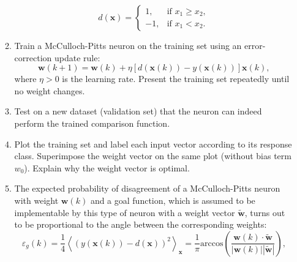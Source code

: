 \documentclass[12pt, a4]{article}
\begin{document}
\begin{enumerate}
\begin{enumerate}
                \begin{equation*}
                    d(\mathbf{x})=
                    \begin{cases}
                        1, & \text{if } x_1\geq x_2, \\
                        -1, & \text{if } x_1<x_2.
                    \end{cases}
                \end{equation*}
            \item Train a McCulloch-Pitts neuron on the training set
                using an error-correction update rule:
                \begin{equation}
                    \textbf{w}(k+1)=\mathbf{w}(k)+\eta
                    [d(\mathbf{x}(k))-y(\mathbf{x}(k))]\mathbf{x}(k),
                    \label{eq:errorupdate}
                \end{equation}
                where $\eta>0$ is the learning rate.
                Present the training set repeatedly until no weight
                changes.
            \item Test on a new dataset (validation set) that the
                neuron can indeed perform the trained comparison function.
            \item\label{it:optimalweight} Plot the training set and label each
                input vector according to its response class. Superimpose the
                weight vector on the same plot (without bias term $w_0$).
                Explain why the weight vector is optimal.
            \item \label{it:gen_error} The expected probability of disagreement
                of a McCulloch-Pitts neuron with weight $\mathbf{w}(k)$ and a
                goal function, which is assumed to be implementable by this
                type of neuron with a weight vector $\mathbf{\tilde w}$, turns
                out to be proportional to the angle between the corresponding
                weights:
                \begin{equation}
                    \varepsilon_g(k) = \frac{1}{4} \left<
                    \left( y\left(\mathbf{x}\left(k\right)\right) -
                    d\left(\mathbf{x}\right) \right)^2 \right>_\mathbf{x} =
                    \frac{1}{\pi} \mathrm{arccos} \left( \frac{\mathbf{w}(k)
                    \cdot \mathbf{\tilde w}}{|\mathbf{w}(k)| |\mathbf{\tilde
                    w}|} \right),
                    \label{eq:generalizationerr}
                \end{equation}

\end{enumerate}
\end{enumerate}
\end{document}
